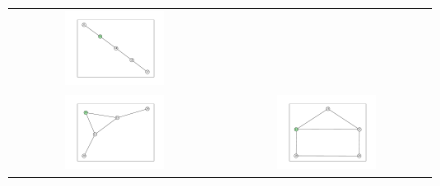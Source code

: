 \documentclass[12pt, a4paper]{extarticle}
\begin{document}
\begin{figure}
\begin{tabularx}{\textwidth}{cc}
\includegraphics[width=0.5\textwidth]{task11-graphlets/5_16-21-17-18-23.pdf} \\
\includegraphics[width=0.5\textwidth]{task11-graphlets/5_21-25-20-23-26.pdf} &
\includegraphics[width=0.5\textwidth]{task11-graphlets/5_21-18-25-22-23.pdf} \\
\end{tabularx}\end{figure}
\end{document}

